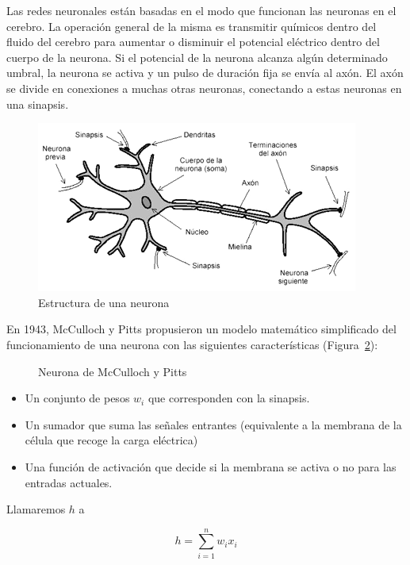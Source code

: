 Las redes neuronales están basadas en el modo que funcionan las neuronas en el cerebro. La operación general de la misma es transmitir químicos dentro del fluido del cerebro para aumentar o disminuir el potencial eléctrico dentro del cuerpo de la neurona. Si el potencial de la neurona alcanza algún determinado umbral, la neurona se activa y un pulso de duración fija se envía al axón. El axón se divide en conexiones a muchas otras neuronas, conectando a estas neuronas en una sinapsis.\\

\begin{figure}[tbph!]
\centering
\includegraphics[width=0.7\linewidth]{imagenes/neurona.png}
\caption{Estructura de una neurona}
\label{fig:neurona}
\end{figure}

En 1943, McCulloch y Pitts propusieron un modelo matemático simplificado del funcionamiento de una neurona con las siguientes características (Figura~\ref{fig:mccullochpitts}):

\begin{figure}[htbp!]
\label{fig:mccullochpitts}
\begin{center}
	\neuronaMcCullochPitts
\end{center}
\caption{Neurona de McCulloch y Pitts}
\end{figure}

\begin{itemize}
	\item Un conjunto de pesos $w_i$ que corresponden con la sinapsis.
	\item Un sumador que suma las señales entrantes (equivalente a la membrana de la célula que recoge la carga eléctrica)
	\item Una función de activación que decide si la membrana se activa o no para las entradas actuales. 
\end{itemize} 

Llamaremos $h$ a

\begin{equation}
h = \sum_{i=1}^{n} w_i x_i
\end{equation}

